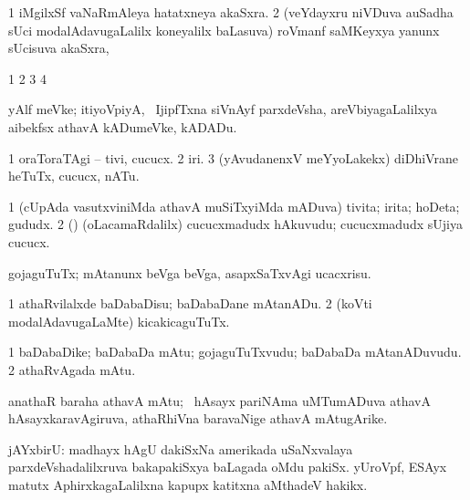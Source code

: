 \bentry
{}
\gl{\nA}
\bmng
\bnum
\num{1} iMgilxSf vaNaRmAleya hatatxneya akaSxra. 
\num{2} (veYdayxru niVDuva auSadha sUci modalAdavugaLalilx koneyalilx baLasuva) roVmanf saMKeyxya  yanunx sUcisuva akaSxra, \udA\  
\enum
\emng
\eentry

\bentry
{}
\pron{}
\gl{\saMkiSx}
\bmng
\bnum
\num{1}  
\num{2}  
\num{3}  
\num{4}  
\enum
\emng
\eentry

\bentry
{}
\gl{\nA}
\bmng
yAlf meVke; itiyoVpiyA, \kanu\ IjipfTxna siVnAyf parxdeVsha, areVbiyagaLalilxya aibekfsx athavA kADumeVke, kADADu. 
\emng
\eentry

\bentry
{}
\gl{\sakirx}
\bmng
\bnum
\num{1} oraToraTAgi -- tivi, cucucx. 
\num{2} iri. 
\num{3} (yAvudanenxV meYyoLakekx) diDhiVrane heTuTx, cucucx, nATu. 
\enum
\emng
\eentry

\bentry
{}
\gl{\nA}
\bmng
\bnum
\num{1} (cUpAda vasutxviniMda athavA muSiTxyiMda mADuva) tivita; irita; hoDeta; gududx. 
\num{2} (\AmA) (oLacamaRdalilx) cucucxmadudx hAkuvudu; cucucxmadudx sUjiya cucucx. 
\enum
\emng
\eentry

\bentry
{}
\gl{\kirx}


\noindent
\gl{\sakirx}
\bmng
gojaguTuTx; mAtanunx beVga beVga, asapxSaTxvAgi ucacxrisu. 
\emng

\noindent
\gl{\akirx}
\bmng
\bnum
\num{1} athaRvilalxde baDabaDisu; baDabaDane mAtanADu. 
\num{2} (koVti modalAdavugaLaMte) kicakicaguTuTx. 
\enum
\emng
\eentry

\bentry
{}
\gl{\nA}
\bmng
\bnum
\num{1} baDabaDike; baDabaDa mAtu; gojaguTuTxvudu; baDabaDa mAtanADuvudu. 
\num{2} athaRvAgada mAtu. 
\enum
\emng
\eentry

\bentry
{}
\gl{\nA}
\bmng
anathaR baraha athavA mAtu; \kanmu\ hAsayx pariNAma uMTumADuva athavA hAsayxkaravAgiruva, athaRhiVna baravaNige athavA mAtugArike. 
\emng
\eentry

\bentry
{}
\gl{\nA}
\bmng
jAYxbirU: 
\banum
{} madhayx hAgU dakiSxNa amerikada uSaNxvalaya parxdeVshadalilxruva bakapakiSxya baLagada oMdu pakiSx. 
 yUroVpf, ESAyx matutx AphirxkagaLalilxna kapupx katitxna aMthadeV hakikx. 
\eanum
\emng
\eentry

